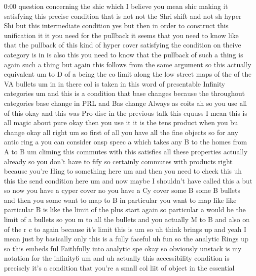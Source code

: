 \begin{unfinished}{0:00}
question  concerning  the  shic  which  I
believe  you  mean  shic  making  it
satisfying  this  precise  condition  that
is  not  not  the  Shri  shift  and  not  sh
hyper  Shi  but  this  intermediate
condition
yes  but  then  in  order  to  construct  this
unification  it  it  you  need  for  the
pullback  it  seems  that  you  need  to  know
like  that  the  pullback  of  this  kind  of
hyper  cover  satisfying  the  condition  on
theive  category  is  in  is  also  this  you
need  to  know  that  the  pullback  of  such  a
thing  is  again  such  a  thing  but  again
this  follows  from  the  same  argument  so
this  actually
equivalent
um  to  D  of  a  being  the  co  limit  along
the  low  street  maps  of  the  of  the  VA
bullets  um  in  in  there  col  is  taken  in
this  word  of  presentable  Infinity
categories  um  and  this  is  a  condition
that  base  changes  because  the  throughout
categories  base  change  in
PRL  and  Bas  change  Always  as
coits  ah  so  you  use  all  of  this  okay  and
this  was  Pro  disc  in  the  previous  talk
this
equuss  I  mean  this  is  all  magic  about
pure  okay  then  you  use  it  it  is  the  tens
product  when  you  bu  change
okay  all  right  um  so  first  of  all  you
have  all  the  fine  objects  so  for  any
antic  ring  a  you  can  consider  onsp  speec
a  which  takes  any  B  to  the  homes  from  A
to
B  um
climing  this  commutes  with  this
satisfies  all  these  properties  actually
already  so  you  don't  have  to  fify  so
certainly  commutes  with  products  right
because  you're  Hing  to  something  here  um
and  then  you  need  to  check  this  uh  this
the  send  condition  here
um  and  now  maybe  I  shouldn't  have  called
this  a  but  so  now  you  have  a  cyper  cover
no  you  have  a  Cy  cover  some  B  some  B
bullets  and  then  you  some  want  to  map  to
B  in  particular  you  want  to  map  like
like  particular  B  is  like  the  limit  of
the  plus  start  again  so  particular  a
would  be  the  limit  of  a  bullets  so  you  m
to  all
the  bullets  and  you  actually  M  to  B  and
also  on  of  the  r  c  to  again  because  it's
limit  this
is
um
so
uh  think  brings
up  and  yeah  I  mean  just  by  basically
only  this  is  a  fully
faceful  uh  fun  so  the  analytic  Rings  up
so  this  embeds  ful  Faithfully  into
analytic
spe  okay  so  obviously  unstack  is  my
notation  for  the
infinity6
um
and  uh  actually  this  accessibility
condition  is  precisely  it's  a  condition
that  you're  a  small  col  liit  of  object
in  the  essential

\end{unfinished}
